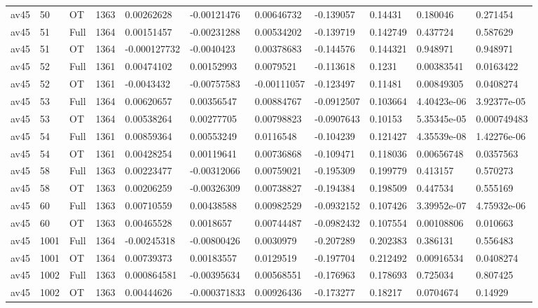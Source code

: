 \begin{landscape}
\begin{longtable}{lllllllllll}
av45 & 50 & OT & 1363 & 0.00262628 & -0.00121476 & 0.00646732 & -0.139057 & 0.14431 & 0.180046 & 0.271454 \\
av45 & 51 & Full & 1364 & 0.00151457 & -0.00231288 & 0.00534202 & -0.139719 & 0.142749 & 0.437724 & 0.587629 \\
av45 & 51 & OT & 1364 & -0.000127732 & -0.0040423 & 0.00378683 & -0.144576 & 0.144321 & 0.948971 & 0.948971 \\
av45 & 52 & Full & 1361 & 0.00474102 & 0.00152993 & 0.0079521 & -0.113618 & 0.1231 & 0.00383541 & 0.0163422 \\
av45 & 52 & OT & 1361 & -0.0043432 & -0.00757583 & -0.00111057 & -0.123497 & 0.11481 & 0.00849305 & 0.0408274 \\
av45 & 53 & Full & 1364 & 0.00620657 & 0.00356547 & 0.00884767 & -0.0912507 & 0.103664 & 4.40423e-06 & 3.92377e-05 \\
av45 & 53 & OT & 1364 & 0.00538264 & 0.00277705 & 0.00798823 & -0.0907643 & 0.10153 & 5.35345e-05 & 0.000749483 \\
av45 & 54 & Full & 1361 & 0.00859364 & 0.00553249 & 0.0116548 & -0.104239 & 0.121427 & 4.35539e-08 & 1.42276e-06 \\
av45 & 54 & OT & 1361 & 0.00428254 & 0.00119641 & 0.00736868 & -0.109471 & 0.118036 & 0.00656748 & 0.0357563 \\
av45 & 58 & Full & 1363 & 0.00223477 & -0.00312066 & 0.00759021 & -0.195309 & 0.199779 & 0.413157 & 0.570273 \\
av45 & 58 & OT & 1363 & 0.00206259 & -0.00326309 & 0.00738827 & -0.194384 & 0.198509 & 0.447534 & 0.555169 \\
av45 & 60 & Full & 1363 & 0.00710559 & 0.00438588 & 0.00982529 & -0.0932152 & 0.107426 & 3.39952e-07 & 4.75932e-06 \\
av45 & 60 & OT & 1363 & 0.00465528 & 0.0018657 & 0.00744487 & -0.0982432 & 0.107554 & 0.00108806 & 0.010663 \\
av45 & 1001 & Full & 1364 & -0.00245318 & -0.00800426 & 0.0030979 & -0.207289 & 0.202383 & 0.386131 & 0.556483 \\
av45 & 1001 & OT & 1364 & 0.00739373 & 0.00183557 & 0.0129519 & -0.197704 & 0.212492 & 0.00916534 & 0.0408274 \\
av45 & 1002 & Full & 1363 & 0.000864581 & -0.00395634 & 0.00568551 & -0.176963 & 0.178693 & 0.725034 & 0.807425 \\
av45 & 1002 & OT & 1363 & 0.00444626 & -0.000371833 & 0.00926436 & -0.173277 & 0.18217 & 0.0704674 & 0.14929 \\

\end{longtable}
\end{landscape}
